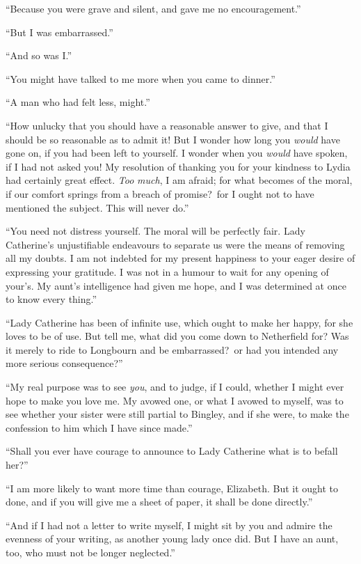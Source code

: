 \documentclass[12pt,english,oneside]{book}
\begin{document}
{}``Because you were grave and silent, and gave me no encouragement.''

{}``But I was embarrassed.''

{}``And so was I.''

{}``You might have talked to me more when you came to dinner.''

{}``A man who had felt less, might.''

{}``How unlucky that you should have a reasonable answer to give,
and that I should be so reasonable as to admit it! But I wonder how
long you \textit{would} have gone on, if you had been left to yourself.
I wonder when you \textit{would} have spoken, if I had not asked you!
My resolution of thanking you for your kindness to Lydia had certainly
great effect. \textit{Too} \textit{much}, I am afraid; for what becomes
of the moral, if our comfort springs from a breach of promise?\ for
I ought not to have mentioned the subject. This will never do.''

{}``You need not distress yourself. The moral will be perfectly fair.
Lady Catherine's unjustifiable endeavours to separate us were the
means of removing all my doubts. I am not indebted for my present
happiness to your eager desire of expressing your gratitude. I was
not in a humour to wait for any opening of your's. My aunt's intelligence
had given me hope, and I was determined at once to know every thing.''

{}``Lady Catherine has been of infinite use, which ought to make
her happy, for she loves to be of use. But tell me, what did you come
down to Netherfield for? Was it merely to ride to Longbourn and be
embarrassed?\ or had you intended any more serious consequence?''\


{}``My real purpose was to see \textit{you}, and to judge, if I could,
whether I might ever hope to make you love me. My avowed one, or what
I avowed to myself, was to see whether your sister were still partial
to Bingley, and if she were, to make the confession to him which I
have since made.''

{}``Shall you ever have courage to announce to Lady Catherine what
is to befall her?''\ 

{}``I am more likely to want more time than courage, Elizabeth. But
it ought to done, and if you will give me a sheet of paper, it shall
be done directly.''

{}``And if I had not a letter to write myself, I might sit by you
and admire the evenness of your writing, as another young lady once
did. But I have an aunt, too, who must not be longer neglected.''
\end{document}
